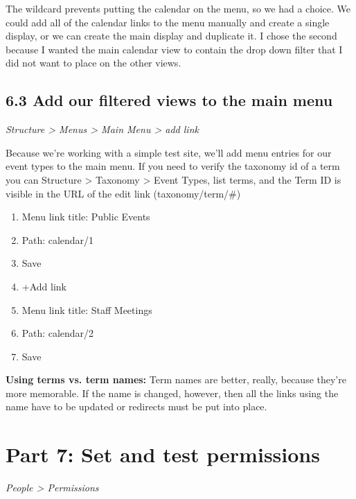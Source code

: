 \documentclass[letterpaper,10pt,english]{sphinxmanual}
\begin{document}
The wildcard prevents putting the calendar on the menu, so we had a choice. We could add all of the calendar links to the menu manually and create a single display, or we can create the main display and duplicate it. I chose the second because I wanted the main calendar view to contain the drop down filter that I did not want to place on the other views.


\section{6.3 Add our filtered views to the main menu}
\label{event_calendar:add-our-filtered-views-to-the-main-menu}
\emph{Structure \textgreater{} Menus \textgreater{} Main Menu \textgreater{} add link}

Because we're working with a simple test site, we'll add menu entries for our event types to the main menu. If you need to verify the taxonomy id of a term you can Structure \textgreater{} Taxonomy \textgreater{} Event Types, list terms, and the Term ID is visible in the URL of the edit link (taxonomy/term/\#)
\begin{enumerate}
\item {} 
Menu link title: Public Events

\item {} 
Path: calendar/1

\item {} 
Save

\item {} 
+Add link

\item {} 
Menu link title: Staff Meetings

\item {} 
Path: calendar/2

\item {} 
Save

\end{enumerate}

\textbf{Using terms vs. term names:} Term names are better, really, because they're more memorable. If the name is changed, however, then all the links using the name have to be updated or redirects must be put into place.


\chapter{Part 7: Set and test permissions}
\label{event_calendar:part-7-set-and-test-permissions}
\emph{People \textgreater{} Permissions}
\end{document}
